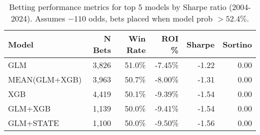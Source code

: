 \begin{table}[t]
  \centering
  \small
  \caption[Betting performance metrics]{Betting performance metrics for top 5 models by Sharpe ratio (2004-2024). Assumes $-110$ odds, bets placed when model prob $> 52.4\%$.}
  \label{tab:betting-performance}
  \setlength{\tabcolsep}{3pt}\renewcommand{\arraystretch}{1.12}
  \begin{tabular}{@{} l r r r r r @{} }
    \toprule
    \textbf{Model} & \textbf{N Bets} & \textbf{Win Rate} & \textbf{ROI \%} & \textbf{Sharpe} & \textbf{Sortino} \\
    \midrule
    GLM & 3,826 & 51.0\% & -7.45\% & -1.22 & 0.00 \\
    MEAN(GLM+XGB) & 3,963 & 50.7\% & -8.00\% & -1.31 & 0.00 \\
    XGB & 4,419 & 50.1\% & -9.39\% & -1.54 & 0.00 \\
    GLM+XGB & 1,139 & 50.0\% & -9.41\% & -1.54 & 0.00 \\
    GLM+STATE & 1,100 & 50.0\% & -9.50\% & -1.56 & 0.00 \\
    \bottomrule
  \end{tabular}
\end{table}
